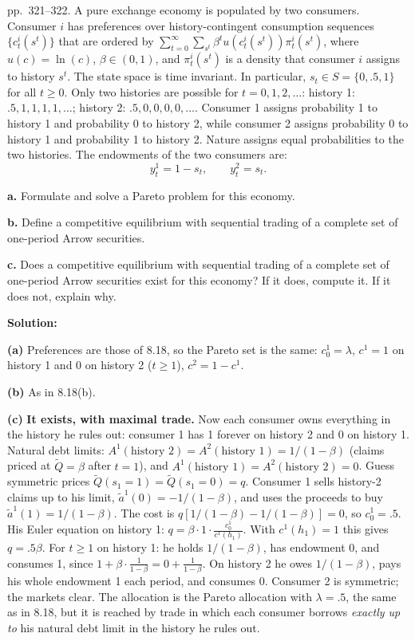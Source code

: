 \documentclass[12pt, letterpaper]{article}
\begin{document}
\begin{tcolorbox}[oddbox,title={Exercise 8.19 \quad Diverse beliefs, V}]
\begin{tcolorbox}[questionbox]
pp.~321--322. A pure exchange economy is populated by two consumers. Consumer $i$ has preferences over
history-contingent consumption sequences $\{c^i_t(s^t)\}$ that are ordered by
$\sum_{t=0}^\infty\sum_{s^t}\beta^tu(c^i_t(s^t))\pi^i_t(s^t)$, where $u(c)=\ln(c)$, $\beta\in(0,1)$, and $\pi^i_t(s^t)$ is
a density that consumer $i$ assigns to history $s^t$. The state space is time invariant. In particular,
$s_t\in S=\{0,.5,1\}$ for all $t\ge0$. Only two histories are possible for $t=0,1,2,\dots$: history 1:
$.5,1,1,1,1,\dots$; history 2: $.5,0,0,0,0,\dots$. Consumer 1 assigns probability 1 to history 1 and
probability 0 to history 2, while consumer 2 assigns probability 0 to history 1 and probability 1 to history 2.
Nature assigns equal probabilities to the two histories. The endowments of the two consumers are:
\[
y^1_t=1-s_t,\qquad y^2_t=s_t.
\]

\textbf{a.} Formulate and solve a Pareto problem for this economy.

\textbf{b.} Define a competitive equilibrium with sequential trading of a complete set of one-period Arrow
securities.

\textbf{c.} Does a competitive equilibrium with sequential trading of a complete set of one-period Arrow
securities exist for this economy? If it does, compute it. If it does not, explain why.
\end{tcolorbox}

\textbf{Solution:}

\textbf{(a)} Preferences are those of 8.18, so the Pareto set is the same: $c^1_0=\lambda$, $c^1=1$ on history 1 and $0$
on history 2 ($t\ge1$), $c^2=1-c^1$.

\textbf{(b)} As in 8.18(b).

\textbf{(c)} \textbf{It exists, with maximal trade.} Now each consumer owns everything in the history he rules out:
consumer 1 has 1 forever on history 2 and 0 on history 1. Natural debt limits:
$A^1(\text{history 2})=A^2(\text{history 1})=1/(1-\beta)$ (claims priced at $\tilde Q=\beta$ after $t=1$), and
$A^1(\text{history 1})=A^2(\text{history 2})=0$. Guess symmetric prices $\tilde Q(s_1{=}1)=\tilde Q(s_1{=}0)=q$.
Consumer 1 sells history-2 claims up to his limit, $\tilde a^1(0)=-1/(1-\beta)$, and uses the proceeds to buy
$\tilde a^1(1)=1/(1-\beta)$. The cost is $q[1/(1-\beta)-1/(1-\beta)]=0$, so $c^1_0=.5$. His Euler equation on history 1:
$q=\beta\cdot1\cdot\frac{c^1_0}{c^1(h_1)}$. With $c^1(h_1)=1$ this gives $q=.5\beta$. For $t\ge1$ on history 1: he holds
$1/(1-\beta)$, has endowment 0, and consumes 1, since $1+\beta\cdot\frac1{1-\beta}=0+\frac1{1-\beta}$. On history 2 he owes
$1/(1-\beta)$, pays his whole endowment 1 each period, and consumes 0. Consumer 2 is symmetric; the markets
clear. The allocation is the Pareto allocation with $\lambda=.5$, the same as in 8.18, but it is reached by trade in
which each consumer borrows \emph{exactly up to} his natural debt limit in the history he rules out.


\end{tcolorbox}
\end{document}
